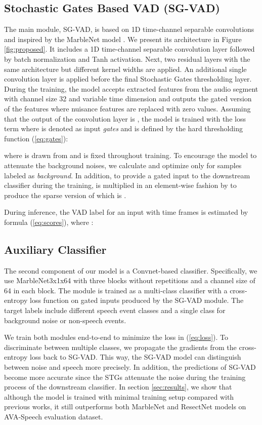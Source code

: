 \documentclass{article}
\begin{document}
\subsection{Stochastic Gates Based VAD (SG-VAD)}
\label{sec:sgvad}

The main module, SG-VAD, is based on 1D time-channel separable convolutions and inspired by the MarbleNet model \cite{jia2021marblenet}. We present its architecture in Figure \ref{fig:proposed}. It includes a 1D time-channel separable convolution layer followed by batch normalization and Tanh activation. Next, two residual layers with the same architecture but different kernel widths are applied. An additional single  convolution layer is applied before the final Stochastic Gates thresholding layer.
During the training, the model accepts extracted features from the audio segment with channel size 32 and variable time dimension and outputs the gated version of the features where nuisance features are replaced with zero values. Assuming that the output of the  convolution layer is , the model is trained with the loss term  where  is denoted as input \textit{gates} and is defined by the hard thresholding function (\ref{eq:gates}):


where  is drawn from  and  is fixed throughout training. To encourage the model to attenuate the background noises, we calculate and optimize  only for samples labeled as \textit{background}. In addition, to provide a gated input to the downstream classifier during the training,  is multiplied in an element-wise fashion by  to produce the sparse version of  which is .

During inference, the VAD label  for an input  with  time frames is estimated by formula (\ref{eq:scores}), where :




\subsection{Auxiliary Classifier}
\label{sec:aclass}
The second component of our model is a Convnet-based classifier. Specifically, we use MarbleNet3x1x64 \cite{jia2021marblenet} with three blocks without repetitions and a channel size of 64 in each block. The module is trained as a multi-class classifier with a cross-entropy loss  function on gated inputs  produced by the SG-VAD module. The target labels include different speech event classes and a single class for background noise or non-speech events.
 
We train both modules end-to-end to minimize the loss in (\ref{eq:loss}). To discriminate between multiple classes, we propagate the gradients from the cross-entropy loss back to SG-VAD. This way, the SG-VAD model can distinguish between noise and speech more precisely. In addition, the predictions of SG-VAD become more accurate since the STGs attenuate the noise during the training process of the downstream classifier. In section \ref{sec:results}, we show that although the model is trained with minimal training setup compared with previous works, it still outperforms both MarbleNet \cite{jia2021marblenet} and ResectNet \cite{kopuklu2022resectnet} models on AVA-Speech \cite{chaudhuri2018ava} evaluation dataset.
\end{document}
